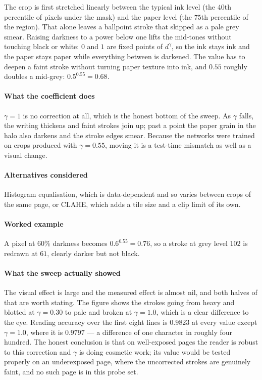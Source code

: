 The crop is first stretched linearly between the typical ink level (the $40$th percentile of pixels under the mask) and the paper level (the $75$th percentile of the region). That alone leaves a ballpoint stroke that skipped as a pale grey smear. Raising darkness to a power below one lifts the mid-tones without touching black or white: $0$ and $1$ are fixed points of $d^{\gamma}$, so the ink stays ink and the paper stays paper while everything between is darkened. The value has to deepen a faint stroke without turning paper texture into ink, and $0.55$ roughly doubles a mid-grey: $0.5^{0.55} = 0.68$.

\paragraph{What the coefficient does}

$\gamma = 1$ is no correction at all, which is the honest bottom of the sweep. As $\gamma$ falls, the writing thickens and faint strokes join up; past a point the paper grain in the halo also darkens and the stroke edges smear. Because the networks were trained on crops produced with $\gamma = 0.55$, moving it is a test-time mismatch as well as a visual change.

\paragraph{Alternatives considered}

Histogram equalisation, which is data-dependent and so varies between crops of the same page, or CLAHE, which adds a tile size and a clip limit of its own.

\paragraph{Worked example}

A pixel at $60\%$ darkness becomes $0.6^{0.55} = 0.76$, so a stroke at grey level $102$ is redrawn at $61$, clearly darker but not black.

\paragraph{What the sweep actually showed}

The visual effect is large and the measured effect is almost nil, and both halves of that are worth stating. The figure shows the strokes going from heavy and blotted at $\gamma = 0.30$ to pale and broken at $\gamma = 1.0$, which is a clear difference to the eye. Reading accuracy over the first eight lines is $0.9823$ at every value except $\gamma = 1.0$, where it is $0.9797$ --- a difference of one character in roughly four hundred. The honest conclusion is that on well-exposed pages the reader is robust to this correction and $\gamma$ is doing cosmetic work; its value would be tested properly on an underexposed page, where the uncorrected strokes are genuinely faint, and no such page is in this probe set.

